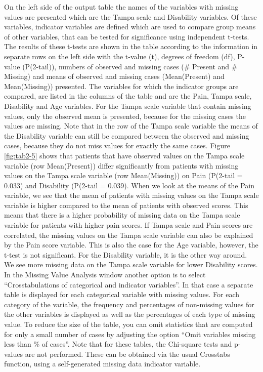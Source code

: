 \documentclass[]{book}
\begin{document}
On the left side of the output table the names of the variables with
missing values are presented which are the Tampa scale and Disability
variables. Of these variables, indicator variables are defined which are
used to compare group means of other variables, that can be tested for
significance using independent t-tests. The results of these t-tests are
shown in the table according to the information in separate rows on the
left side with the t-value (t), degrees of freedom (df), P-value
(P(2-tail)), numbers of observed and missing cases (\# Present and \#
Missing) and means of observed and missing cases (Mean(Present) and
Mean(Missing)) presented. The variables for which the indicator groups
are compared, are listed in the columns of the table and are the Pain,
Tampa scale, Disability and Age variables. For the Tampa scale variable
that contain missing values, only the observed mean is presented,
because for the missing cases the values are missing. Note that in the
row of the Tampa scale variable the means of the Disability variable can
still be compared between the observed and missing cases, because they
do not miss values for exactly the same cases. Figure \ref{fig:tab2-5}
shows that patients that have observed values on the Tampa scale
variable (row Mean(Present)) differ significantly from patients with
missing values on the Tampa scale variable (row Mean(Missing)) on Pain
(P(2-tail = 0.033) and Disability (P(2-tail = 0.039). When we look at
the means of the Pain variable, we see that the mean of patients with
missing values on the Tampa scale variable is higher compared to the
mean of patients with observed scores. This means that there is a higher
probability of missing data on the Tampa scale variable for patients
with higher pain scores. If Tampa scale and Pain scores are correlated,
the missing values on the Tampa scale variable can also be explained by
the Pain score variable. This is also the case for the Age variable,
however, the t-test is not significant. For the Disability variable, it
is the other way around. We see more missing data on the Tampa scale
variable for lower Disability scores. In the Missing Value Analysis
window another option is to select ``Crosstabulations of categorical and
indicator variables''. In that case a separate table is displayed for
each categorical variable with missing values. For each category of the
variable, the frequency and percentages of non-missing values for the
other variables is displayed as well as the percentages of each type of
missing value. To reduce the size of the table, you can omit statistics
that are computed for only a small number of cases by adjusting the
option ``Omit variables missing less than \% of cases''. Note that for
these tables, the Chi-square tests and p-values are not performed. These
can be obtained via the usual Crosstabs function, using a self-generated
missing data indicator variable.
\end{document}
